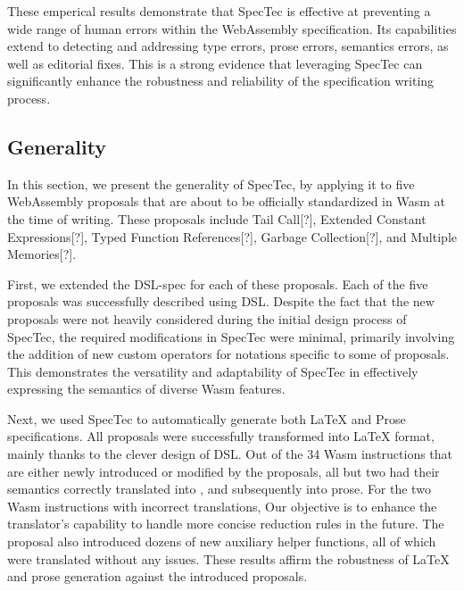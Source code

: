 These emperical results demonstrate that SpecTec is effective at preventing a
wide range of human errors within the WebAssembly specification.  Its
capabilities extend to detecting and addressing type errors, prose errors,
semantics errors, as well as editorial fixes. This is a strong evidence that
leveraging SpecTec can significantly enhance the robustness and reliability of
the specification writing process.

\subsection{Generality}
In this section, we present the generality of SpecTec, by applying it to five
WebAssembly proposals that are about to be officially standardized in Wasm at
the time of writing. These proposals include Tail Call[?], Extended Constant
Expressions[?], Typed Function References[?], Garbage Collection[?], and
Multiple Memories[?].

First, we extended the DSL-spec for each of these proposals. Each
of the five proposals was successfully described using DSL.  Despite the fact
that the new proposals were not heavily considered during the initial design
process of SpecTec, the required modifications in SpecTec were minimal,
primarily involving the addition of new custom operators for notations specific
to some of proposals. This demonstrates the versatility and adaptability of
SpecTec in effectively expressing the semantics of diverse Wasm features.

Next, we used SpecTec to automatically generate both LaTeX and Prose
specifications.  All proposals were successfully transformed into LaTeX format,
mainly thanks to the clever design of DSL.  Out of the 34 Wasm instructions
that are either newly introduced or modified by the proposals, all but two had
their semantics correctly translated into \al, and subsequently into prose. For
the two Wasm instructions with incorrect translations,  Our objective is to
enhance the translator's capability to handle more concise reduction rules in
the future. The proposal also introduced dozens of new auxiliary helper
functions, all of which were translated without any issues.  These results
affirm the robustness of LaTeX and prose generation against the introduced
proposals.

